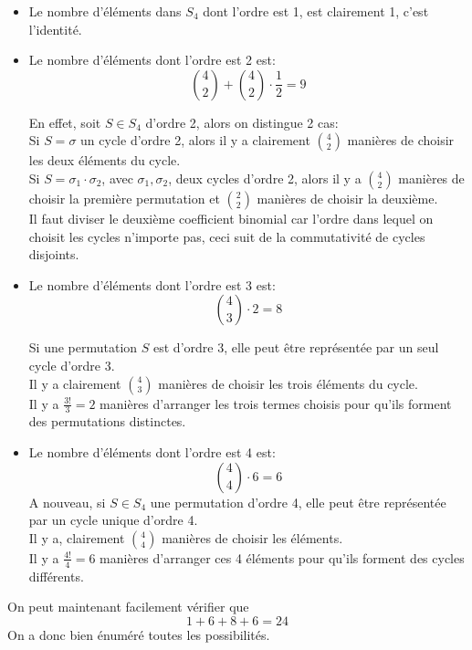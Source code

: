 \documentclass[11pt, a4paper]{article}
\begin{document}
\begin{itemize}
\item Le nombre d'éléments dans $S_4$ dont l'ordre est 1, est clairement 1, c'est l'identité.\\
\item Le nombre d'éléments dont l'ordre est 2 est:
	\[ 
		\binom{4}{2} + \binom{4}{2} \cdot \frac{1}{2} = 9
	\]

En effet, soit $S \in S_4$ d'ordre 2, alors on distingue 2 cas:\\
Si $S = \sigma$ un cycle d'ordre 2, alors il y a clairement $\binom{4}{2}$ manières de choisir les deux éléments du cycle.\\
Si $S= \sigma_1 \cdot \sigma_2$, avec $\sigma_1,\sigma_2$, deux cycles d'ordre 2, alors il y a $\binom{4}{2}$ manières de choisir la première permutation et $\binom{2}{2}$ manières de choisir la deuxième.\\
Il faut diviser le deuxième coefficient binomial car l'ordre dans lequel on choisit les cycles n'importe pas, ceci suit de la commutativité de cycles disjoints.
\item Le nombre d'éléments dont l'ordre est 3 est:
	\[ 
		\binom{4}{3} \cdot 2 = 8
	\]

Si une permutation $S$ est d'ordre 3, elle peut être représentée par un seul cycle d'ordre 3.\\
Il y a clairement $\binom{4}{3}$ manières de choisir les trois éléments du cycle.\\
Il y a $\frac{3!}{3}=2$ manières d'arranger les trois termes choisis pour qu'ils forment des permutations distinctes.

\item Le nombre d'éléments dont l'ordre est 4 est:
	\[ 
		\binom{4}{4} \cdot 6 = 6
	\]
A nouveau, si $S \in S_4$ une permutation d'ordre 4, elle peut être représentée par un cycle unique d'ordre 4.\\
Il y a, clairement $\binom{4}{4}$ manières de choisir les éléments.\\
Il y a $\frac{4!}{4}=6$ manières d'arranger ces 4 éléments pour qu'ils forment des cycles différents.
\end{itemize}
On peut maintenant facilement vérifier que
\[ 
1 + 6 + 8 + 6 = 24
\]
On a donc bien énuméré toutes les possibilités.
\end{document}
